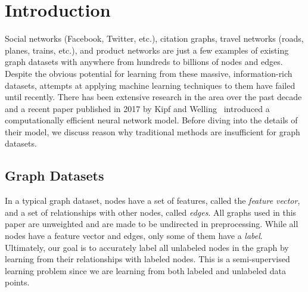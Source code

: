\section{Introduction} \label{sec:introduction}

Social networks (Facebook, Twitter, etc.), citation graphs, travel networks (roads, planes, trains, etc.), and product networks are just a few examples of existing graph datasets with anywhere from hundreds to billions of nodes and edges. Despite the obvious potential for learning from these massive, information-rich datasets, attempts at applying machine learning techniques to them have failed until recently. There has been extensive research in the area over the past decade and a recent paper published in 2017 by Kipf and Welling~\cite{Kipf2016} introduced a computationally efficient neural network model. Before diving into the details of their model, we discuss reason why traditional methods are insufficient for graph datasets. 

\subsection{Graph Datasets} \label{sec:network-datasets}
In a typical graph dataset, nodes have a set of features, called the \textit{feature vector}, and a set of relationships with other nodes, called \textit{edges}. All graphs used in this paper are unweighted and are made to be undirected in preprocessing. While all nodes have a feature vector and edges, only some of them have a \textit{label}. Ultimately, our goal is to accurately label all unlabeled nodes in the graph by learning from their relationships with labeled nodes. This is a semi-supervised learning problem since we are learning from both labeled and unlabeled data points. 


